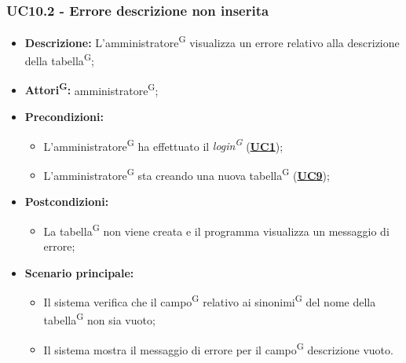 \subsubsection{UC10.2 - Errore descrizione non inserita}
\label{sec:UC10.3}
\begin{itemize}
	\item \textbf{Descrizione:} L’amministratore\textsuperscript{G} visualizza un errore relativo alla descrizione della tabella\textsuperscript{G};
	\item \textbf{Attori\textsuperscript{G}:} amministratore\textsuperscript{G};
	\item \textbf{Precondizioni:} 
	\begin{itemize}
		\item L’amministratore\textsuperscript{G} ha effettuato il \textit{login\textsuperscript{G}} (\hyperref[sec:UC1]{\textbf{UC1}});
		\item L’amministratore\textsuperscript{G} sta creando una nuova tabella\textsuperscript{G} (\hyperref[sec:UC9]{\textbf{UC9}});
	\end{itemize}
	\item \textbf{Postcondizioni:} 
	\begin{itemize}
		\item La tabella\textsuperscript{G} non viene creata e il programma visualizza un messaggio di errore;
	\end{itemize}
	\item \textbf{Scenario principale:} 
	\begin{itemize}
		\item Il sistema verifica che il campo\textsuperscript{G} relativo ai sinonimi\textsuperscript{G} del nome della tabella\textsuperscript{G} non sia vuoto;
		\item Il sistema mostra il messaggio di errore per il campo\textsuperscript{G} descrizione vuoto.
	\end{itemize}
\end{itemize}

